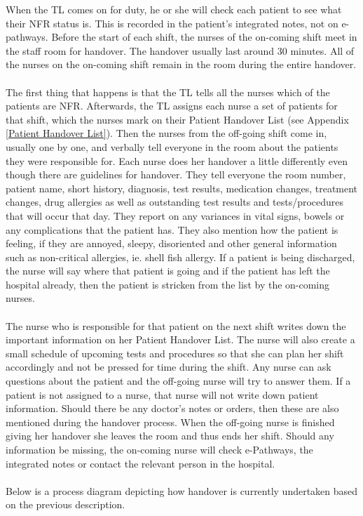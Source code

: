 \newpage
\noindent When the TL comes on for duty, he or she will check each patient to see what their NFR status is. This is recorded in the patient's integrated notes, not on e-pathways. Before the start of each shift, the nurses of the on-coming shift meet in the staff room for handover. The handover usually last around 30 minutes. All of the nurses on the on-coming shift remain in the room during the entire handover. 
\\ \\ 
The first thing that happens is that the TL tells all the nurses which of the patients are NFR. Afterwards, the TL assigns each nurse a set of patients for that shift, which the nurses mark on their Patient Handover List (see Appendix \ref{Patient Handover List}). Then the nurses from the off-going shift come in, usually one by one, and verbally tell everyone in the room about the patients they were responsible for. Each nurse does her handover a little differently even though there are guidelines for handover. They tell everyone the room number, patient name, short history, diagnosis, test results, medication changes, treatment changes, drug allergies as well as outstanding test results and tests/procedures that will occur that day. They report on any variances in vital signs, bowels or any complications that the patient has. They also mention how the patient is feeling, if they are annoyed, sleepy, disoriented and other general information such as non-critical allergies, ie. shell fish allergy. If a patient is being discharged, the nurse will say where that patient is going and if the patient has left the hospital already, then the patient is stricken from the list by the on-coming nurses. 
\\ \\
The nurse who is responsible for that patient on the next shift writes down the important information on her Patient Handover List. The nurse will also create a small schedule of upcoming tests and procedures so that she can plan her shift accordingly and not be pressed for time during the shift. Any nurse can ask questions about the patient and the off-going nurse will try to answer them. If a patient is not assigned to a nurse, that nurse will not write down patient information. Should there be any doctor's notes or orders, then these are also mentioned during the handover process. When the off-going nurse is finished giving her handover she leaves the room and thus ends her shift. Should any information be missing, the on-coming nurse will check e-Pathways, the integrated notes or contact the relevant person in the hospital.
\\ \\
Below is a process diagram depicting how handover is currently undertaken based on the previous description.

